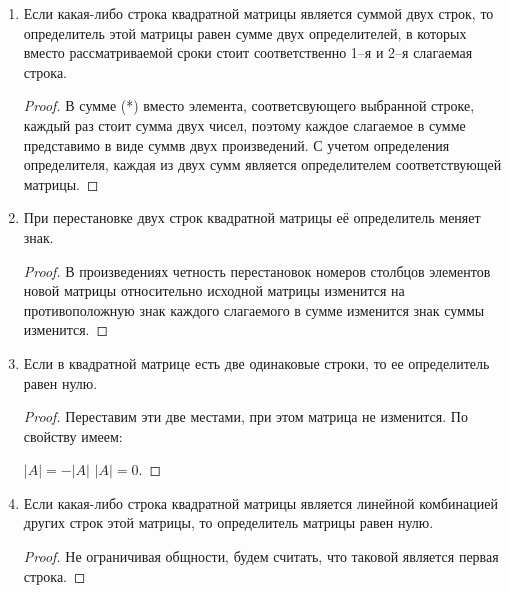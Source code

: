 \begin{enumerate}
\begin{proof}
\end{proof}
\begin{remark}
$|\alpha{}A|=\alpha^n|A|$, где $n$ --- размер матрицы.
\end{remark}
\item Если какая-либо строка квадратной матрицы является суммой двух строк, то определитель этой матрицы равен сумме двух определителей, в которых вместо рассматриваемой сроки стоит соответственно 1--я и 2--я слагаемая строка.
\begin{proof}
В сумме (*) вместо элемента, соответсвующего выбранной строке, каждый раз стоит сумма двух чисел, поэтому каждое слагаемое в сумме представимо в виде суммв двух произведений. С учетом определения определителя, каждая из двух сумм является определителем соответствующей матрицы.
\end{proof}
\item При перестановке двух строк квадратной матрицы её определитель меняет знак.
\begin{proof}
В произведениях четность перестановок номеров столбцов элементов новой матрицы относительно исходной матрицы изменится на противоположную \then знак каждого слагаемого в сумме изменится \then знак суммы изменится.
\end{proof}
\item Если в квадратной матрице есть две одинаковые строки, то ее определитель равен нулю.
\begin{proof}
Переставим эти две местами, при этом матрица не изменится. По свойству имеем:

$|A|=-|A|$ \then $|A|=0$.
\end{proof}
\item Если какая-либо строка квадратной матрицы является линейной комбинацией других строк этой матрицы, то определитель матрицы равен нулю.
\begin{proof}
Не ограничивая общности, будем считать, что таковой является первая строка.


\end{proof}
\end{enumerate}
